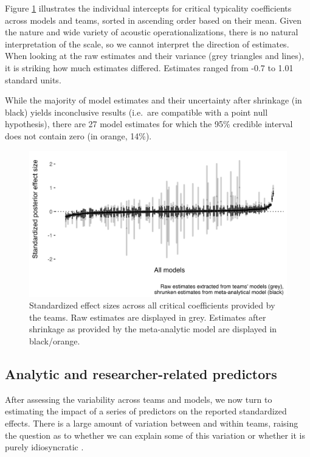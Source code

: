 \documentclass[Review,times,sageh]{sagej}
\begin{document}
Figure \ref{fig:plot-meta1} illustrates the individual intercepts for critical typicality coefficients across models and teams, sorted in ascending order based on their mean.
Given the nature and wide variety of acoustic operationalizations, there is no natural interpretation of the scale, so we cannot interpret the direction of estimates.
When looking at the raw estimates and their variance (grey triangles and lines), it is striking how much estimates differed.
Estimates ranged from -0.7 to 1.01 standard units.

While the majority of model estimates and their uncertainty after shrinkage (in black) yields inconclusive results (i.e.~are compatible with a point null hypothesis), there are 27 model estimates for which the 95\% credible interval does not contain zero (in orange, 14\%).



\begin{figure}
\includegraphics[width=1\linewidth]{../figs/meta_plot1_shrinkage} \caption{Standardized effect sizes across all critical coefficients provided by the teams. Raw estimates are displayed in grey. Estimates after shrinkage as provided by the meta-analytic model are displayed in black/orange.}\label{fig:plot-meta1}
\end{figure}

\hypertarget{analytic-and-researcher-related-predictors}{%
\subsection{Analytic and researcher-related predictors}\label{analytic-and-researcher-related-predictors}}

After assessing the variability across teams and models, we now turn to estimating the impact of a series of predictors on the reported standardized effects.
There is a large amount of variation between and within teams, raising the question as to whether we can explain some of this variation or whether it is purely idiosyncratic \citep{breznau2021observing}.
\end{document}
